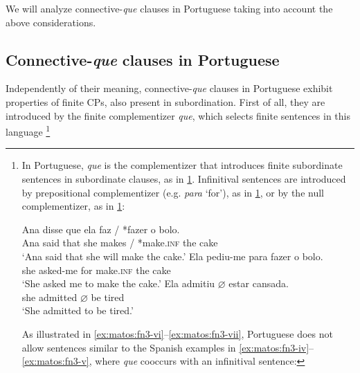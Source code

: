 \documentclass[output=paper,colorlinks,citecolor=brown,
]{langscibook}
\begin{document}
We will analyze connective-\textit{que} clauses in Portuguese taking into account the above considerations.


\subsection{Connective-\textit{que} clauses in Portuguese} \label{sec:matos:sect4-3}

Independently of their meaning, connective-\textit{que} clauses in Portuguese exhibit properties of finite CPs, also present in subordination. First of all, they are introduced by the finite complementizer \textit{que}, which selects finite sentences in this language
\footnote{In Portuguese, \textit{que} is the complementizer that introduces finite subordinate sentences in subordinate clauses, as in \ref{ex:matos:fn3-i}. Infinitival sentences are introduced by prepositional complementizer (e.g. \textit{para} ‘for’), as in \ref{ex:matos:fn3-ii}, or by the null complementizer, as in \ref{ex:matos:fn3-iii}:

\ea
  \ea\label{ex:matos:fn3-i}
    \gll Ana disse que ela faz / *fazer o bolo.\\
                    Ana said that she makes / *make.\textsc{inf} the cake\\
    \glt ‘Ana said that she will make the cake.’ 
  \ex\label{ex:matos:fn3-ii}
    \gll Ela pediu-me para fazer o bolo.\\ 
                    she asked-me for make.\textsc{inf} the cake\\
    \glt ‘She asked me to make the cake.’
  \ex\label{ex:matos:fn3-iii}
    \gll Ela admitiu $\varnothing$ estar cansada.\\
                    she admitted $\varnothing$  be tired\\
    \glt ‘She admitted to be tired.’ 
  \z 
\z 

As illustrated in \ref{ex:matos:fn3-vi}--\ref{ex:matos:fn3-vii}, Portuguese does not allow sentences similar to the Spanish examples in \ref{ex:matos:fn3-iv}--\ref{ex:matos:fn3-v}, where \textit{que} cooccurs with an infinitival sentence:

}
\end{document}
